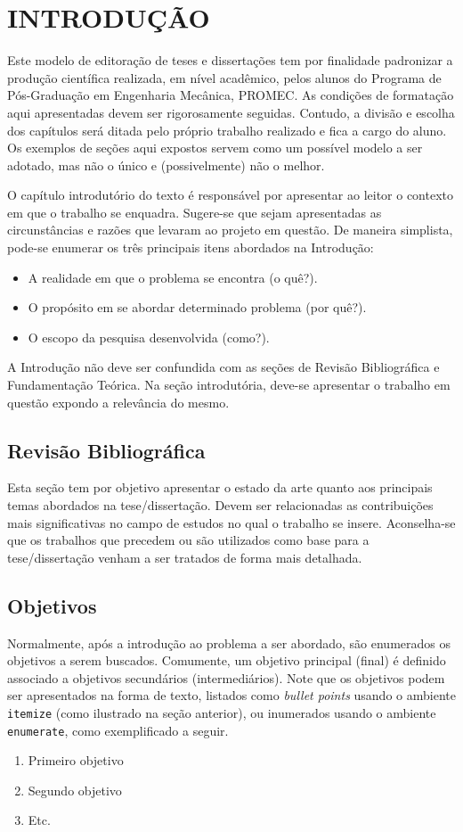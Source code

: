 \chapter{INTRODUÇÃO}\label{Cap:introducao}
Este modelo de editoração de teses e dissertações tem por finalidade padronizar a produção científica realizada, em nível acadêmico, pelos alunos do Programa de Pós-Graduação em Engenharia Mecânica, PROMEC. As condições de formatação aqui apresentadas devem ser rigorosamente seguidas. Contudo, a divisão e escolha dos capítulos será ditada pelo próprio trabalho realizado e fica a cargo do aluno. Os exemplos de seções aqui expostos servem como um possível modelo a ser adotado, mas não o único e (possivelmente) não o melhor.
 
O capítulo introdutório do texto é responsável por apresentar ao leitor o contexto em que o trabalho se enquadra. Sugere-se que sejam apresentadas as circunstâncias e razões que levaram ao projeto em questão. De maneira simplista, pode-se enumerar os três principais itens abordados na Introdução:
\begin{itemize}
\item A realidade em que o problema se encontra (o quê?).
\item O propósito em se abordar determinado problema (por quê?).
\item O escopo da pesquisa desenvolvida (como?).
\end{itemize}

A Introdução não deve ser confundida com as seções de Revisão Bibliográfica e Fundamentação Teórica. Na seção introdutória, deve-se apresentar o trabalho em questão expondo a relevância do mesmo.

\section{Revisão Bibliográfica}
Esta seção tem por objetivo apresentar o estado da arte quanto aos principais temas abordados na tese/dissertação. Devem ser relacionadas as contribuições mais significativas no campo de estudos no qual o trabalho se insere. Aconselha-se que os trabalhos que precedem ou são utilizados como base para a tese/dissertação venham a ser tratados de forma mais detalhada.

\section{Objetivos}
Normalmente, após a introdução ao problema a ser abordado, são enumerados os objetivos a serem buscados. Comumente, um objetivo principal (final) é definido associado a objetivos secundários (intermediários). Note que os objetivos podem ser apresentados na forma de texto, listados como \textit{bullet points} usando o ambiente \texttt{itemize} (como ilustrado na seção anterior), ou inumerados usando o ambiente \texttt{enumerate}, como exemplificado a seguir.
\begin{enumerate}
    \item Primeiro objetivo
    \item Segundo objetivo
    \item Etc.
\end{enumerate}

